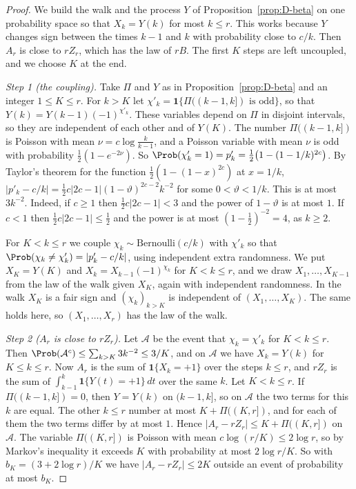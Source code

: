 \begin{proof}
We build the walk and the process $Y$ of Proposition~\ref{prop:D-beta} on one
probability space so that $X_k=Y(k)$ for most $k\le r$. This works because
$Y$ changes sign between the times $k-1$ and $k$ with probability close to
$c/k$. Then $A_r$ is close to $rZ_r$, which has the law of $rB$. The first
$K$ steps are left uncoupled, and we choose $K$ at the end.

\emph{Step 1 (the coupling).} Take $\Pi$ and $Y$ as in
Proposition~\ref{prop:D-beta} and an integer $1\le K\le r$. For $k>K$ let
$\chi'_k=\mathbf 1\{\Pi((k-1,k])\text{ is odd}\}$, so that
$Y(k)=Y(k-1)(-1)^{\chi'_k}$. These variables depend on $\Pi$ in disjoint
intervals, so they are independent of each other and of $Y(K)$. The number
$\Pi((k-1,k])$ is Poisson with mean $\nu=c\log\frac k{k-1}$, and a
Poisson variable with mean $\nu$ is odd with probability
$\frac12(1-e^{-2\nu})$. So
$\Prob(\chi'_k=1)=p'_k=\frac12\bigl(1-(1-1/k)^{2c}\bigr)$. By Taylor's theorem
for the function $\frac12(1-(1-x)^{2c})$ at $x=1/k$,
$\lvert p'_k-c/k\rvert=\frac12c\lvert2c-1\rvert(1-\vartheta)^{2c-2}k^{-2}$ for
some $0<\vartheta<1/k$. This is at most $3k^{-2}$. Indeed, if $c\ge1$ then
$\frac12c\lvert2c-1\rvert<3$ and the power of $1-\vartheta$ is at most $1$.
If $c<1$ then $\frac12c\lvert2c-1\rvert\le\frac12$ and the power is at most
$(1-\frac12)^{-2}=4$, as $k\ge2$.

For $K<k\le r$ we couple $\chi_k\sim\text{Bernoulli}(c/k)$ with $\chi'_k$ so
that $\Prob(\chi_k\ne\chi'_k)=\lvert p'_k-c/k\rvert$, using independent extra
randomness. We put $X_K=Y(K)$ and $X_k=X_{k-1}(-1)^{\chi_k}$ for $K<k\le r$,
and we draw $X_1,\dots,X_{K-1}$ from the law of the walk given $X_K$, again
with independent randomness. In the walk $X_K$ is a fair sign and
$(\chi_k)_{k>K}$ is independent of $(X_1,\dots,X_K)$. The same holds here, so
$(X_1,\dots,X_r)$ has the law of the walk.

\emph{Step 2 ($A_r$ is close to $rZ_r$).} Let $\mathcal A$ be the event that
$\chi_k=\chi'_k$ for $K<k\le r$. Then
$\Prob(\mathcal A^c)\le\sum_{k>K}3k^{-2}\le3/K$, and on $\mathcal A$ we have
$X_k=Y(k)$ for $K\le k\le r$. Now $A_r$ is the sum of
$\mathbf 1\{X_k=+1\}$ over the steps $k\le r$, and $rZ_r$ is the sum of
$\int_{k-1}^k\mathbf 1\{Y(t)=+1\}\,dt$ over the same $k$. Let $K<k\le r$. If
$\Pi((k-1,k])=0$, then $Y=Y(k)$ on $(k-1,k]$, so on $\mathcal A$ the two
terms for this $k$ are equal. The other $k\le r$ number at most
$K+\Pi((K,r])$, and for each of them the two terms differ by at most $1$.
Hence $\lvert A_r-rZ_r\rvert\le K+\Pi((K,r])$ on $\mathcal A$. The variable
$\Pi((K,r])$ is Poisson with mean $c\log(r/K)\le2\log r$, so by Markov's
inequality it exceeds $K$ with probability at most $2\log r/K$. So with
$b_K=(3+2\log r)/K$ we have $\lvert A_r-rZ_r\rvert\le2K$ outside an event of
probability at most $b_K$.


\end{proof}
